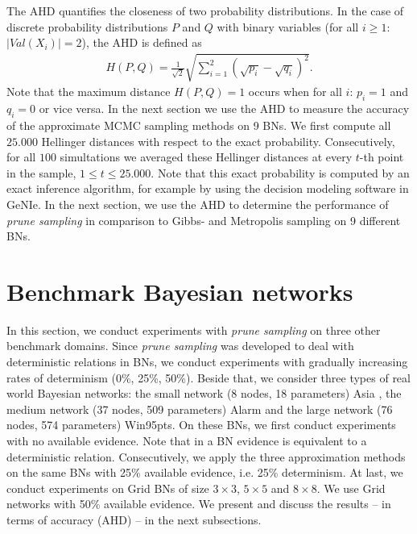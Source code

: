 \documentclass[a4paper, twoside, 11pt]{report}
\theoremstyle{plain}
\theoremstyle{definition}
\theoremstyle{remark}
\newcommand{\ps}{\textit{prune sampling }}
\begin{document}
The \gls{AHD} quantifies the closeness of two probability distributions. In the case of discrete probability distributions $P$ and $Q$ with binary variables (for all $i\geq 1$: $|Val(X_i)| = 2$), the AHD is defined as
\begin{align*}
H(P,Q) = \frac{1}{\sqrt{2}}\sqrt{ \sum_{i=1}^2 ( \sqrt{p_i} - \sqrt{q_i})^2 }.
\end{align*}
Note that the maximum distance $H(P,Q) = 1$ occurs when for all $i$: $p_i =1$ and $q_i = 0$ or vice versa. In the next section we use the AHD to measure the accuracy of the approximate MCMC sampling methods on 9 BNs. We first compute all $25.000$ Hellinger distances with respect to the exact probability. Consecutively, for all $100$ simultations we averaged these Hellinger distances at every $t$-th point in the sample, $1 \leq t \leq 25.000$. Note that this exact probability is computed by an exact inference algorithm, for example by using the decision modeling software in GeNIe. In the next section, we use the AHD to determine the performance of \ps in comparison to Gibbs- and Metropolis sampling on 9 different BNs.

\section{Benchmark Bayesian networks}\label{BenchBNs}
In this section, we conduct experiments with \ps on three other benchmark domains. Since \ps was developed to deal with deterministic relations in BNs, we conduct experiments with gradually increasing rates of determinism (0\%, 25\%, 50\%). Beside that, we consider three types of real world Bayesian networks: the small network (8 nodes, 18 parameters) Asia \cite{lauritzen1988local}, the medium network (37 nodes, 509 parameters) Alarm \cite{beinlich1989alarm} and the large network (76 nodes, 574 parameters) Win95pts. On these BNs, we first conduct experiments with no available evidence. Note that in a BN evidence is equivalent to a deterministic relation. Consecutively, we apply the three approximation methods on the same BNs with 25\% available evidence, i.e. 25\% determinism. At last, we conduct experiments on Grid BNs  \cite{sang2005solving} of size $3 \times 3$, $5 \times 5$ and $8 \times 8$. We use Grid networks with 50\% available evidence. We present and discuss the results -- in terms of accuracy (AHD) -- in the next subsections.
\end{document}
